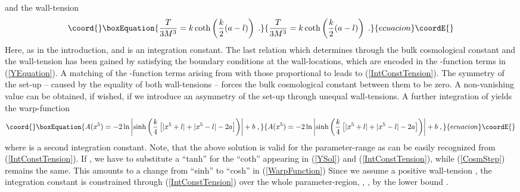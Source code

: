 \documentclass[a4paper,12pt]{article}
\begin{document}
and the wall-tension
\begin{equation}\coord{}\boxEquation{
  \frac{T}{3M^3} = k\coth\left(\frac{k}{2}(a-l)\right) \; .
   \label{IntConstTension}
}{
  \frac{T}{3M^3} = k\coth\left(\frac{k}{2}(a-l)\right) \; .
   }{ecuacion}\coordE{}\end{equation}
Here, as in the introduction, \coordHE{} and \coordHE{} is an
integration constant. The last
relation which determines \coordHE{} through the bulk
cosmological constant \coordHE{} and the wall-tension \coordHE{} has been gained by
satisfying the boundary conditions at the wall-locations, which are encoded in
the \myHighlight{$\delta$}\coordHE{}-function terms in (\ref{YEquation}). A matching of the
\myHighlight{$\delta$}\coordHE{}-function terms arising from \coordHE{} with those proportional to \coordHE{}
leads to (\ref{IntConstTension}).
The symmetry of the set-up -- caused by the equality of both wall-tensions --
forces the bulk cosmological constant between them to be zero. A non-vanishing
value can be obtained, if wished, if we introduce an asymmetry of the set-up
through unequal wall-tensions.
A further integration of \coordHE{} yields the warp-function
\begin{equation}\coord{}\boxEquation{
  A(x^5)=-2\ln\left|\sinh\left(\frac{k}{4}
                                \left[|x^5+l|+|x^5-l|-2a\right]
                          \right)
              \right| + b \; ,
  \label{WarpFunction}
}{
  A(x^5)=-2\ln\left|\sinh\left(\frac{k}{4}
                                \left[|x^5+l|+|x^5-l|-2a\right]
                          \right)
              \right| + b \; ,
  }{ecuacion}\coordE{}\end{equation}
where \coordHE{} is a second integration constant.
Note, that the above solution is valid for the parameter-range \coordHE{} as can be easily recognized from
(\ref{IntConstTension}). If \coordHE{}, we have to
substitute a ``tanh'' for the ``coth'' appearing in (\ref{YSol}) and
(\ref{IntConstTension}), while (\ref{CosmStep}) remains the same. This amounts
to a change from ``sinh'' to ``cosh'' in (\ref{WarpFunction})
Since we assume a positive wall-tension \coordHE{}, the integration constant
\coordHE{} is constrained through (\ref{IntConstTension}) over the whole
parameter-region, \coordHE{}, \coordHE{}, by the lower bound \coordHE{}. 
\end{document}
